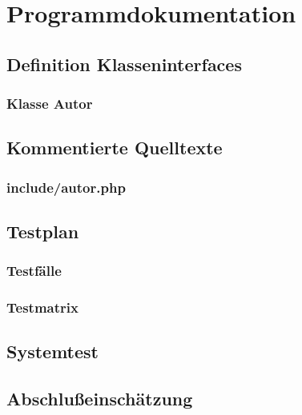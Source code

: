 \chapter{Programmdokumentation}
\section{Definition Klasseninterfaces}
\subsection{Klasse Autor}


\section{Kommentierte Quelltexte}
\subsection{include/autor.php}


\section{Testplan}
\subsection{Testfälle}

\subsection{Testmatrix}

\section{Systemtest}

\section{Abschlußeinschätzung}